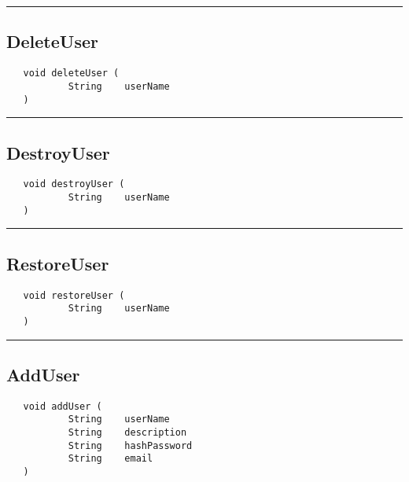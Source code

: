 \rule{15cm}{2pt}
\subsection{DeleteUser}
\label{Api:DeleteUser}
\begin{verbatim}
   void deleteUser (
           String    userName
   )
\end{verbatim}



\rule{15cm}{2pt}
\subsection{DestroyUser}
\label{Api:DestroyUser}
\begin{verbatim}
   void destroyUser (
           String    userName
   )
\end{verbatim}



\rule{15cm}{2pt}
\subsection{RestoreUser}
\label{Api:RestoreUser}
\begin{verbatim}
   void restoreUser (
           String    userName
   )
\end{verbatim}



\rule{15cm}{2pt}
\subsection{AddUser}
\label{Api:AddUser}
\begin{verbatim}
   void addUser (
           String    userName
           String    description
           String    hashPassword
           String    email
   )
\end{verbatim}



